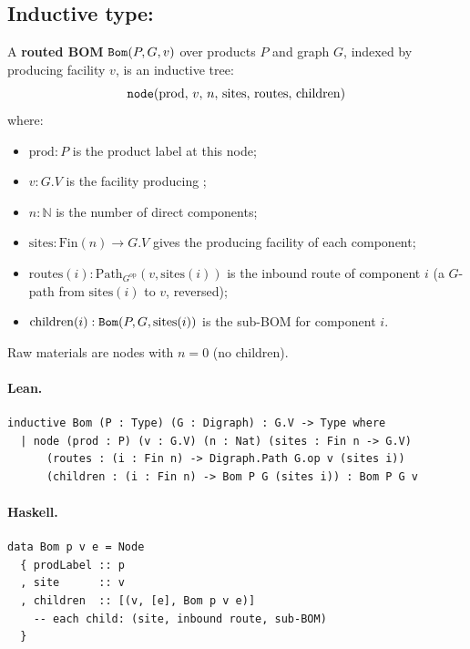 \documentclass[11pt,a4paper]{article}
\begin{document}
\subsection{Inductive type: }

\begin{defn}
A \textbf{routed BOM} $\texttt{Bom}(P, G, v)$ over products $P$ and graph $G$,
indexed by producing facility $v$, is an inductive tree:
\[
  \texttt{node}(\mathrm{prod},\, v,\, n,\, \mathrm{sites},\, \mathrm{routes},\, \mathrm{children})
\]
where:
\begin{itemize}
  \item $\mathrm{prod} : P$ is the product label at this node;
  \item $v : G.V$ is the facility producing ;
  \item $n : \mathbb{N}$ is the number of direct components;
  \item $\mathrm{sites} : \mathrm{Fin}(n) \to G.V$ gives the producing facility
    of each component;
  \item $\mathrm{routes}(i) : \mathrm{Path}_{G^{\mathrm{op}}}(v, \mathrm{sites}(i))$
    is the inbound route of component $i$ (a $G$-path from $\mathrm{sites}(i)$
    to $v$, reversed);
  \item $\mathrm{children}(i) : \texttt{Bom}(P, G, \mathrm{sites}(i))$ is the
    sub-BOM for component $i$.
\end{itemize}
Raw materials are nodes with $n = 0$ (no children).
\end{defn}

\paragraph{Lean.}
\begin{lstlisting}[style=lean]
inductive Bom (P : Type) (G : Digraph) : G.V -> Type where
  | node (prod : P) (v : G.V) (n : Nat) (sites : Fin n -> G.V)
      (routes : (i : Fin n) -> Digraph.Path G.op v (sites i))
      (children : (i : Fin n) -> Bom P G (sites i)) : Bom P G v
\end{lstlisting}

\paragraph{Haskell.}
\begin{lstlisting}[style=haskell]
data Bom p v e = Node
  { prodLabel :: p
  , site      :: v
  , children  :: [(v, [e], Bom p v e)]
    -- each child: (site, inbound route, sub-BOM)
  }
\end{lstlisting}
\end{document}
